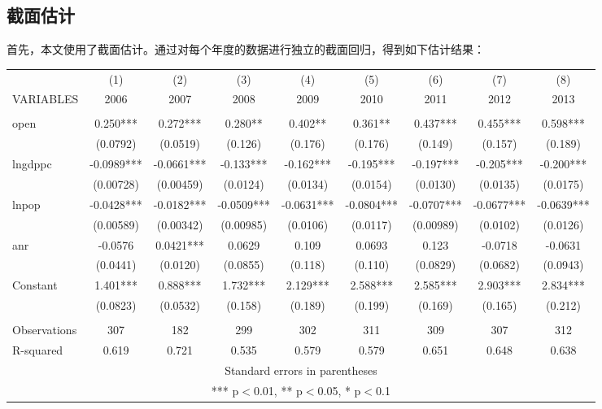 \documentclass[10pt]{article}
\begin{document}
\subsection{截面估计}
首先，本文使用了截面估计。通过对每个年度的数据进行独立的截面回归，得到如下估计结果：

\begin{center}
\begin{tabular}{lcccccccc}
    \small
    \multicolumn{9}{c}{截面回归结果} \\ \hline
     & (1) & (2) & (3) & (4) & (5) & (6) & (7) & (8) \\
    VARIABLES & 2006 & 2007 & 2008 & 2009 & 2010 & 2011 & 2012 & 2013 \\ \hline
     &  &  &  &  &  &  &  &  \\
    open & 0.250*** & 0.272*** & 0.280** & 0.402** & 0.361** & 0.437*** & 0.455*** & 0.598*** \\
     & (0.0792) & (0.0519) & (0.126) & (0.176) & (0.176) & (0.149) & (0.157) & (0.189) \\
    lngdppc & -0.0989*** & -0.0661*** & -0.133*** & -0.162*** & -0.195*** & -0.197*** & -0.205*** & -0.200*** \\
     & (0.00728) & (0.00459) & (0.0124) & (0.0134) & (0.0154) & (0.0130) & (0.0135) & (0.0175) \\
    lnpop & -0.0428*** & -0.0182*** & -0.0509*** & -0.0631*** & -0.0804*** & -0.0707*** & -0.0677*** & -0.0639*** \\
     & (0.00589) & (0.00342) & (0.00985) & (0.0106) & (0.0117) & (0.00989) & (0.0102) & (0.0126) \\
    anr & -0.0576 & 0.0421*** & 0.0629 & 0.109 & 0.0693 & 0.123 & -0.0718 & -0.0631 \\
     & (0.0441) & (0.0120) & (0.0855) & (0.118) & (0.110) & (0.0829) & (0.0682) & (0.0943) \\
    Constant & 1.401*** & 0.888*** & 1.732*** & 2.129*** & 2.588*** & 2.585*** & 2.903*** & 2.834*** \\
     & (0.0823) & (0.0532) & (0.158) & (0.189) & (0.199) & (0.169) & (0.165) & (0.212) \\
     &  &  &  &  &  &  &  &  \\
    Observations & 307 & 182 & 299 & 302 & 311 & 309 & 307 & 312 \\
     R-squared & 0.619 & 0.721 & 0.535 & 0.579 & 0.579 & 0.651 & 0.648 & 0.638 \\ \hline
    \multicolumn{9}{c}{ Standard errors in parentheses} \\
    \multicolumn{9}{c}{ *** p$<$0.01, ** p$<$0.05, * p$<$0.1} \\
\end{tabular}
\end{center}
\end{document}
